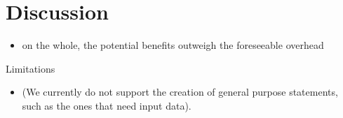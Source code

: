 \section{Discussion}\label{sec:discussion} 

\begin{itemize}
\item on the whole, the potential benefits outweigh the foreseeable overhead
\end{itemize}

Limitations
\begin{itemize}
\item (We currently do not support the creation of general purpose statements, such as the ones that need input data).
\end{itemize}
